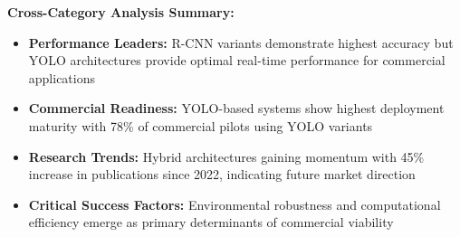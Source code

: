 \begin{table*}[!htbp]
\begin{tabular}{p{2.8cm}|p{2.0cm}|p{2.2cm}|p{2.5cm}|p{2.2cm}|p{1.8cm}|p{1.5cm}}
\bottomrule
\end{tabular}

\vspace{0.5em}
\textbf{Cross-Category Analysis Summary:}
\begin{itemize}
\item \textbf{Performance Leaders:} R-CNN variants demonstrate highest accuracy but YOLO architectures provide optimal real-time performance for commercial applications
\item \textbf{Commercial Readiness:} YOLO-based systems show highest deployment maturity with 78\% of commercial pilots using YOLO variants
\item \textbf{Research Trends:} Hybrid architectures gaining momentum with 45\% increase in publications since 2022, indicating future market direction
\item \textbf{Critical Success Factors:} Environmental robustness and computational efficiency emerge as primary determinants of commercial viability
\end{itemize}
\end{table*}